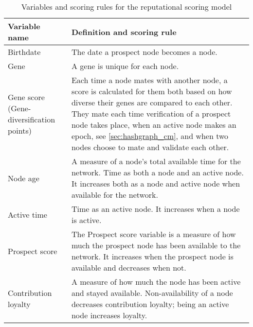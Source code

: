 \begin{table}[H]
 \begin{center}
  \begin{tabular}{|p{4cm}|p{8cm}|}
  \hline
  Variable name & Definition and scoring rule \\
  \hline
  Birthdate & The date a prospect node becomes a node. \\
  \hline
  Gene & A gene is unique for each node. \\
  \hline
  Gene score (Gene-diversification points) & Each time a node mates with another node, a score is calculated for them both based on how diverse their genes are compared to each other. They mate each time verification of a prospect node takes place, when an active node makes an epoch, see \cref{sec:hashgraph_cm}, and when two nodes choose to mate and validate each other. \\
  \hline
  Node age & A measure of a node's total available time for the network. Time as both a node and an active node. It increases both as a node and active node when available for the network. \\
  \hline
  Active time & Time as an active node. It increases when a node is active.\\
  \hline
  Prospect score & The Prospect score variable is a measure of how much the prospect node has been available to the network. It increases when the prospect node is available and decreases when not. \\
  \hline
  Contribution loyalty & A measure of how much the node has been active and stayed available. Non-availability of a node decreases contribution loyalty; being an active node increases loyalty. \\
  \hline
  \end{tabular}
 \end{center}
 \caption{Variables and scoring rules for the reputational scoring model}
 \label{tab:governance_variables}
\end{table}
